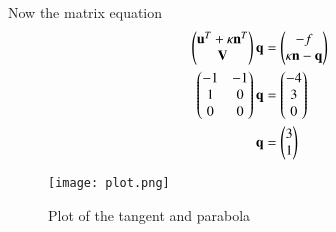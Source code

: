 \documentclass[journal,12pt,twocolumn]{IEEEtran}
\begin{document}
Now the matrix equation 
\begin{align}
    \begin{pmatrix}\mathbf{u}^T+\kappa\mathbf{n}^T\\\mathbf{V}\end{pmatrix}\mathbf{q} &= \begin{pmatrix}-f\\ \kappa\mathbf{n}-\mathbf{q}\end{pmatrix}\\
    \begin{pmatrix}-1 &-1\\1 &0\\0 &0\end{pmatrix}\mathbf{q} &= \begin{pmatrix}-4\\3\\0\end{pmatrix}\\
    \mathbf{q} &= \begin{pmatrix}3\\1\end{pmatrix}
\end{align}
\begin{figure}[ht]
    \centering
    \texttt{[image: plot.png]}
    \caption{Plot of the tangent and parabola}
    \label{plot}
\end{figure}
\end{document}
